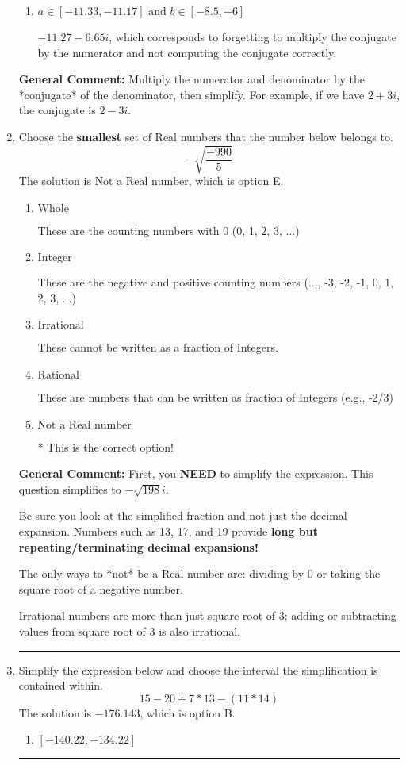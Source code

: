 \documentclass{extbook}[14pt]
\newcommand{\litem}[1]{\item #1

\rule{\textwidth}{0.4pt}}
\begin{document}
\begin{enumerate}
{\begin{enumerate}[label=\Alph*.]
 $-337.00  - 1.81 i$, which corresponds to forgetting to multiply the conjugate by the numerator and using a plus instead of a minus in the denominator.
\item \( a \in [-11.33, -11.17] \text{ and } b \in [-8.5, -6] \)

 $-11.27  - 6.65 i$, which corresponds to forgetting to multiply the conjugate by the numerator and not computing the conjugate correctly.
\end{enumerate}

\textbf{General Comment:} Multiply the numerator and denominator by the *conjugate* of the denominator, then simplify. For example, if we have $2+3i$, the conjugate is $2-3i$.
}
\litem{
Choose the \textbf{smallest} set of Real numbers that the number below belongs to.
\[ -\sqrt{\frac{-990}{5}} \]The solution is \( \text{Not a Real number} \), which is option E.\begin{enumerate}[label=\Alph*.]
\item \( \text{Whole} \)

These are the counting numbers with 0 (0, 1, 2, 3, ...)
\item \( \text{Integer} \)

These are the negative and positive counting numbers (..., -3, -2, -1, 0, 1, 2, 3, ...)
\item \( \text{Irrational} \)

These cannot be written as a fraction of Integers.
\item \( \text{Rational} \)

These are numbers that can be written as fraction of Integers (e.g., -2/3)
\item \( \text{Not a Real number} \)

* This is the correct option!
\end{enumerate}

\textbf{General Comment:} First, you \textbf{NEED} to simplify the expression. This question simplifies to $-\sqrt{198} i$. 
 
 Be sure you look at the simplified fraction and not just the decimal expansion. Numbers such as 13, 17, and 19 provide \textbf{long but repeating/terminating decimal expansions!} 
 
 The only ways to *not* be a Real number are: dividing by 0 or taking the square root of a negative number. 
 
 Irrational numbers are more than just square root of 3: adding or subtracting values from square root of 3 is also irrational.
}
\litem{
Simplify the expression below and choose the interval the simplification is contained within.
\[ 15 - 20 \div 7 * 13 - (11 * 14) \]The solution is \( -176.143 \), which is option B.\begin{enumerate}[label=\Alph*.]
\item \( [-140.22, -134.22] \)


\end{enumerate}}
\end{enumerate}
\end{document}
